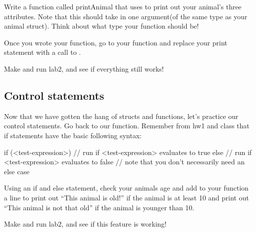 \documentclass{tufte-handout}
\begin{document}
Write a function called printAnimal that uses  to print out your animal's three attributes.  Note that this should take in one argument(of the same type as your animal struct).  Think about what type your function should be!

Once you wrote your function, go to your  function and replace your print statement with a call to .

Make and run lab2, and see if everything still works!  

\subsection{Control statements}

Now that we have gotten the hang of structs and functions, let's practice our control statements.  Go back to our  function.  Remember from hw1 and class that if statements have the basic following syntax:
\begin{Code}
    if (<test-expression>) {
        // run if <test-expression> evaluates to true
    } else {
        // run if <test-expression> evaluates to false
        // note that you don't necessarily need an else case
    }
\end{Code}

Using an if and else statement, check your animals age and add to your
 function a line to print out ``This animal is
old!'' if the animal is at least 10 and print out ``This animal is not
that old'' if the animal is younger than 10.   

Make and run lab2, and see if this feature is working!  
\end{document}
